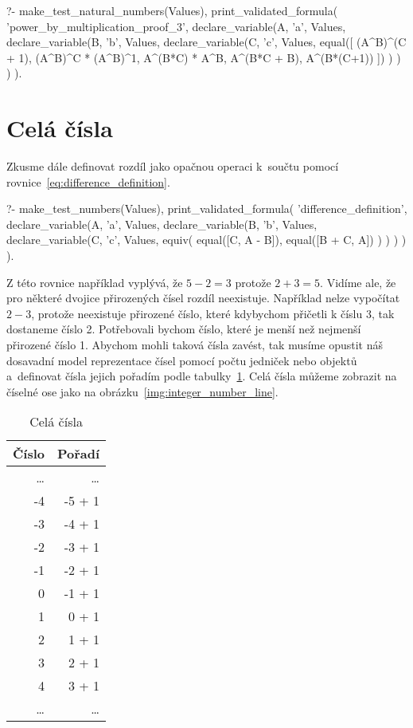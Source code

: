 \begin{prolog}
?-	make_test_natural_numbers(Values),
	print_validated_formula(
		'power_by_multiplication_proof_3',
		declare_variable(A, 'a', Values,
			declare_variable(B, 'b', Values,
				declare_variable(C, 'c', Values,
					equal([
						(A^B)^(C + 1),
						(A^B)^C * (A^B)^1,
						A^(B*C) * A^B,
						A^(B*C + B),
						A^(B*(C+1))
					])
				)
			)
		)
	).
\end{prolog}

\section{Celá čísla}

Zkusme dále definovat rozdíl jako opačnou operaci k~součtu pomocí rovnice~\eqref{eq:difference_definition}.

\begin{prolog}
?-	make_test_numbers(Values),
	print_validated_formula(
		'difference_definition',
		declare_variable(A, 'a', Values,
			declare_variable(B, 'b', Values,
				declare_variable(C, 'c', Values,
					equiv(
						equal([C, A - B]),
						equal([B + C, A])
					)
				)
			)
		)
	).
\end{prolog}

Z této rovnice například vyplývá, že \(5 - 2 = 3\) protože \(2 + 3 = 5\). Vidíme ale, že pro některé dvojice přirozených čísel rozdíl neexistuje. Například nelze vypočítat \(2 - 3\), protože neexistuje přirozené číslo, které kdybychom přičetli k číslu 3, tak dostaneme číslo 2. Potřebovali bychom číslo, které je menší než nejmenší přirozené číslo 1. Abychom mohli taková čísla zavést, tak musíme opustit náš dosavadní model reprezentace čísel pomocí počtu jedniček nebo objektů a~definovat čísla jejich pořadím podle tabulky~\ref{tab:integers}. Celá čísla můžeme zobrazit na číselné ose jako na obrázku~\ref{img:integer_number_line}.

\begin{table}[ht]
\centering
\begin{tabular}{|r|r|}
\hline
Číslo & Pořadí \\
\hline
\ldots & \ldots \\
-4 & -5 + 1 \\
-3 & -4 + 1 \\
-2 & -3 + 1 \\
-1 & -2 + 1 \\
0 & -1 + 1 \\
1 & 0 + 1 \\
2 & 1 + 1 \\
3 & 2 + 1 \\
4 & 3 + 1 \\
\ldots & \ldots \\
\hline
\end{tabular}
\caption{Celá čísla}
\label{tab:integers}
\end{table}

